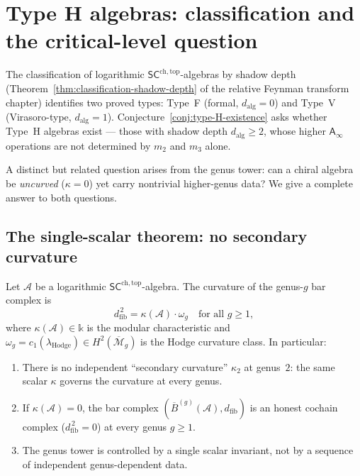 \documentclass[11pt]{article}
\newcommand{\cA}{\mathcal{A}}
\newcommand{\cM}{\mathcal{M}}
\newcommand{\barB}{\overline{B}}
\newcommand{\bD}{\mathbb{D}}
\newcommand{\Ainf}{\mathsf{A}_{\infty}}
\newcommand{\SCchtop}{\mathsf{SC}^{\mathrm{ch,top}}}
\newcommand{\dfib}{d_{\mathrm{fib}}}
\begin{document}
%
%

\section{Type H algebras: classification and the critical-level question}
\label{sec:type-H}

\providecommand{\dalg}{d_{\mathrm{alg}}}
\providecommand{\dfib}{d_{\mathrm{fib}}}
\providecommand{\hvee}{h^{\!\scriptscriptstyle\vee}}
\providecommand{\bD}{\mathbb{D}}

The classification of logarithmic $\SCchtop$-algebras by shadow depth
(Theorem~\ref{thm:classification-shadow-depth} of the relative Feynman
transform chapter) identifies two proved types: Type~F (formal,
$\dalg = 0$) and Type~V (Virasoro-type, $\dalg = 1$).
Conjecture~\ref{conj:type-H-existence} asks whether Type~H algebras
exist --- those with shadow depth $\dalg \geq 2$, whose higher
$\Ainf$ operations are not determined by $m_2$ and $m_3$ alone.

A distinct but related question arises from the genus tower: can
a chiral algebra be \emph{uncurved} ($\kappa = 0$) yet carry nontrivial
higher-genus data?  We give a complete answer to both questions.

\subsection{The single-scalar theorem: no secondary curvature}

\begin{theorem}
\label{thm:no-secondary-curvature}
Let $\cA$ be a logarithmic $\SCchtop$-algebra.
The curvature of the genus-$g$ bar complex is
\begin{equation}\label{eq:universal-curvature}
\dfib^{\,2} = \kappa(\cA) \cdot \omega_g
\quad \text{for all } g \geq 1,
\end{equation}
where $\kappa(\cA) \in \mathbb{k}$ is the modular characteristic
and $\omega_g=c_1(\lambda_{\mathrm{Hodge}})
\in H^2(\overline{\cM}_g)$ is the Hodge curvature class.  In
particular:
\begin{enumerate}[label=\textup{(\roman*)}]
\item There is no independent ``secondary curvature'' $\kappa_2$
  at genus~$2$: the same scalar $\kappa$ governs the curvature
  at every genus.
\item If $\kappa(\cA) = 0$, the bar complex
  $(\barB^{(g)}(\cA), \dfib)$ is an honest cochain complex
  ($\dfib^{\,2} = 0$) at every genus $g \geq 1$.
\item The genus tower is controlled by a single scalar invariant,
  not by a sequence of independent genus-dependent data.
\end{enumerate}
\end{theorem}
\end{document}
